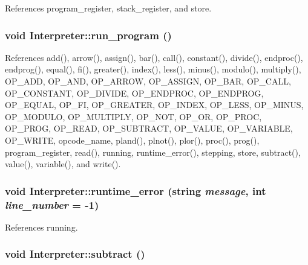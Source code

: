 References program\_\-register, stack\_\-register, and store.

\hypertarget{classInterpreter_a471d0958d94f1378dfbc83d378a604a1}{
\subsubsection[{run\_\-program}]{\setlength{\rightskip}{0pt plus 5cm}void Interpreter::run\_\-program ()}}
\label{classInterpreter_a471d0958d94f1378dfbc83d378a604a1}


References add(), arrow(), assign(), bar(), call(), constant(), divide(), endproc(), endprog(), equal(), fi(), greater(), index(), less(), minus(), modulo(), multiply(), OP\_\-ADD, OP\_\-AND, OP\_\-ARROW, OP\_\-ASSIGN, OP\_\-BAR, OP\_\-CALL, OP\_\-CONSTANT, OP\_\-DIVIDE, OP\_\-ENDPROC, OP\_\-ENDPROG, OP\_\-EQUAL, OP\_\-FI, OP\_\-GREATER, OP\_\-INDEX, OP\_\-LESS, OP\_\-MINUS, OP\_\-MODULO, OP\_\-MULTIPLY, OP\_\-NOT, OP\_\-OR, OP\_\-PROC, OP\_\-PROG, OP\_\-READ, OP\_\-SUBTRACT, OP\_\-VALUE, OP\_\-VARIABLE, OP\_\-WRITE, opcode\_\-name, pland(), plnot(), plor(), proc(), prog(), program\_\-register, read(), running, runtime\_\-error(), stepping, store, subtract(), value(), variable(), and write().

\hypertarget{classInterpreter_ac5ae8c07a18fbec811b37e2dd500c3ef}{
\subsubsection[{runtime\_\-error}]{\setlength{\rightskip}{0pt plus 5cm}void Interpreter::runtime\_\-error (string {\em message}, \/  int {\em line\_\-number} = {\ttfamily -\/1})}}
\label{classInterpreter_ac5ae8c07a18fbec811b37e2dd500c3ef}


References running.

\hypertarget{classInterpreter_aa535362cdd6da9d9f4184e180d8c7f56}{
\subsubsection[{subtract}]{\setlength{\rightskip}{0pt plus 5cm}void Interpreter::subtract ()}}
\label{classInterpreter_aa535362cdd6da9d9f4184e180d8c7f56}


